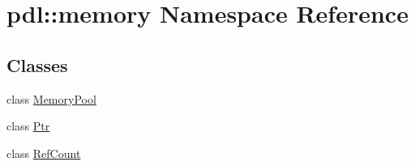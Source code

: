 \hypertarget{namespacepdl_1_1memory}{}\section{pdl\+::memory Namespace Reference}
\label{namespacepdl_1_1memory}
\subsection*{Classes}
\begin{DoxyCompactItemize}
\item 
class \mbox{\hyperlink{classpdl_1_1memory_1_1_memory_pool}{Memory\+Pool}}
\item 
class \mbox{\hyperlink{classpdl_1_1memory_1_1_ptr}{Ptr}}
\item 
class \mbox{\hyperlink{classpdl_1_1memory_1_1_ref_count}{Ref\+Count}}
\end{DoxyCompactItemize}
